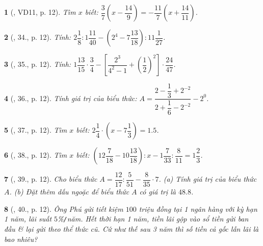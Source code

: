 \documentclass{article}
\newtheorem{baitoan}{}
\begin{document}
\begin{baitoan}[\cite{Tuyen_Toan_7}, VD11, p. 12]
	Tìm $x$ biết: $\dfrac{3}{7}\left(x - \dfrac{14}{9}\right) = -\dfrac{11}{7}\left(x + \dfrac{14}{11}\right)$.
\end{baitoan}

\begin{baitoan}[\cite{Tuyen_Toan_7}, 34., p. 12]
	Tính: $2\dfrac{1}{8}:1\dfrac{11}{40} - \left(2^4 - 7\dfrac{13}{18}\right):11\dfrac{1}{27}$.
\end{baitoan}

\begin{baitoan}[\cite{Tuyen_Toan_7}, 35., p. 12]
	Tính: $1\dfrac{13}{15}\cdot\dfrac{3}{4} - \left[\dfrac{2^3}{4^2 - 1} + \left(\dfrac{1}{2}\right)^2\right]\cdot\dfrac{24}{47}$.
\end{baitoan}

\begin{baitoan}[\cite{Tuyen_Toan_7}, 36., p. 12]
	Tính giá trị của biểu thức: $A = \dfrac{2 - \dfrac{1}{3} + 2^{-2}}{2 + \dfrac{1}{6} - 2^{-2}} - 2^0$.
\end{baitoan}

\begin{baitoan}[\cite{Tuyen_Toan_7}, 37., p. 12]
	Tìm $x$ biết: $2\dfrac{1}{4}\cdot\left(x - 7\dfrac{1}{3}\right) = 1.5$.
\end{baitoan}

\begin{baitoan}[\cite{Tuyen_Toan_7}, 38., p. 12]
	Tìm $x$ biết: $\left(12\dfrac{7}{18} - 10\dfrac{13}{18}\right):x - 1\dfrac{7}{33}:\dfrac{8}{11} = 1\dfrac{2}{3}$.
\end{baitoan}

\begin{baitoan}[\cite{Tuyen_Toan_7}, 39., p. 12]
	Cho biểu thức $A = \dfrac{12}{17}:\dfrac{5}{51} - \dfrac{8}{35}\cdot 7$. (a) Tính giá trị của biểu thức $A$. (b) Đặt thêm dấu ngoặc để biểu thức $A$ có giá trị là $48.8$.
\end{baitoan}

\begin{baitoan}[\cite{Tuyen_Toan_7}, 40., p. 12]
	Ông Phú gửi tiết kiệm $100$ triệu đồng tại 1 ngân hàng với kỳ hạn 1 năm, lãi suất $5$\%\emph{\texttt{/}}năm. Hết thời hạn 1 năm, tiền lãi gộp vào sổ tiền gửi ban đầu \& lại gửi theo thể thức cũ. Cứ như thế sau 3 năm thì số tiền cả gốc lẫn lãi là bao nhiêu?
\end{baitoan}

\end{document}

